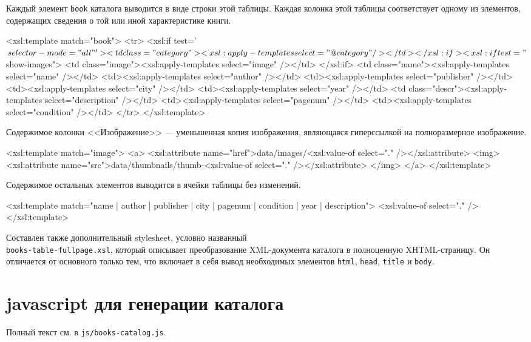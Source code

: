 \documentclass[a4paper,14pt,oneside]{extreport}
\begin{document}
Каждый элемент \verb'book' каталога выводится в виде строки этой таблицы. Каждая колонка этой таблицы соответствует одному из элементов, содержащих сведения о той или иной характеристике книги.
\begin{VerbatimCode}
  <xsl:template match="book">
    <tr>
    <xsl:if test='$selector-mode="all"'>
      <td class="category"><xsl:apply-templates select="@category" /></td>
    </xsl:if>
    <xsl:if test="$show-images">
      <td class="image"><xsl:apply-templates select="image" /></td>
    </xsl:if>
      <td class="name"><xsl:apply-templates select="name" /></td>
      <td><xsl:apply-templates select="author" /></td>
      <td><xsl:apply-templates select="publisher" /></td>
      <td><xsl:apply-templates select="city" /></td>
      <td><xsl:apply-templates select="year" /></td>
      <td class="descr"><xsl:apply-templates select="description" /></td>
      <td><xsl:apply-templates select="pagenum" /></td>
      <td><xsl:apply-templates select="condition" /></td>
    </tr>
  </xsl:template>
\end{VerbatimCode}

Содержимое колонки <<Изображение>> --- уменьшенная копия изображения, являющаяся гиперссылкой на полноразмерное изображение.
\begin{VerbatimCode}
<xsl:template match="image">
  <a>
    <xsl:attribute name="href">data/images/<xsl:value-of select="." /></xsl:attribute>
    <img>
      <xsl:attribute name="src">data/thumbnails/thumb-<xsl:value-of select="." /></xsl:attribute>
    </img>
  </a>
</xsl:template>
\end{VerbatimCode}

Содержимое остальных элементов выводится в ячейки таблицы без изменений.
\begin{VerbatimCode}
<xsl:template match="name | author | publisher | city | pagenum | condition | year | description">
  <xsl:value-of select="." />
</xsl:template>
\end{VerbatimCode}

Составлен также дополнительный stylesheet, условно названный \\ \verb'books-table-fullpage.xsl', который описывает преобразование XML-документа каталога в полноценную XHTML-страницу. Он отличается от основного только тем, что включает в себя вывод необходимых элементов \verb'html', \verb'head', \verb'title' и \verb'body'.

\section{javascript для генерации каталога}
Полный текст см. в \verb'js/books-catalog.js'.
\end{document}
